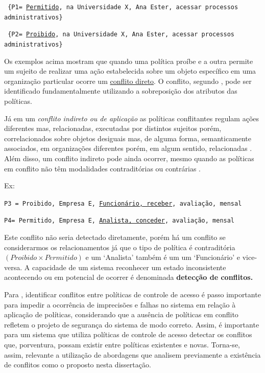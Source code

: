 \documentclass[
	12pt,				%
	openright,			%
	oneside,			%
	a4paper,			%
	english,			%
	french,				%
	spanish,			%
	brazil				%
	]{abntex2}
\begin{document}
{\scriptsize \texttt{ \{P1= {\underline{Permitido}, na Universidade X, Ana Ester, acessar processos administrativos\} }}}

{\scriptsize \texttt{ \{P2= {\underline{Proibido}, na Universidade X, Ana Ester, acessar processos administrativos\} }}}

Os exemplos acima mostram que quando uma política proíbe e a outra permite um sujeito de realizar uma ação estabelecida sobre um objeto específico em uma organização particular ocorre um \underline{conflito direto}. O conflito, segundo , pode ser identificado fundamentalmente utilizando a sobreposição dos atributos das políticas. 

Já em um \textit{conflito indireto ou de aplicação} as políticas conflitantes regulam ações diferentes mas, relacionadas, executadas por distintos sujeitos porém, correlacionados sobre objetos desiguais mas, de alguma forma, semanticamente associados, em organizações diferentes porém, em algum sentido, relacionadas  \cite{cuppens_high_2007}. %
Além disso, um conflito indireto pode ainda ocorrer, mesmo quando as políticas em conflito não têm modalidades contraditórias ou contrárias \cite{sloman_security_2002,lupu_conflicts_1999}.

Ex:

{\scriptsize \texttt{P3 = {Proibido, Empresa E, \underline{Funcionário, receber}, avaliação, mensal}}}

{\scriptsize \texttt{P4= {Permitido, Empresa E, \underline{Analista, conceder}, avaliação, mensal}}}

Este conflito não seria detectado diretamente, porém há um conflito se considerarmos os relacionamentos já que o tipo de política é contraditória $(Proibido \times Permitido)$ e um `Analista' também é um um `Funcionário' e vice-versa. A capacidade de um sistema reconhecer um estado inconsistente acontecendo ou em potencial de ocorrer é denominada \textbf{detecção de conflitos.}

Para , identificar conflitos entre políticas de controle de acesso é passo importante para impedir a ocorrência de imprecisões e falhas no sistema em relação à aplicação de políticas, considerando que a ausência de políticas em conflito refletem o projeto de segurança do sistema de modo correto. Assim, é importante para um sistema que utiliza políticas de controle de acesso detectar os conflitos que, porventura, possam existir entre políticas existentes e novas. Torna-se, assim, relevante a utilização de abordagens que analisem previamente a existência de conflitos como o proposto nesta dissertação.
\end{document}
